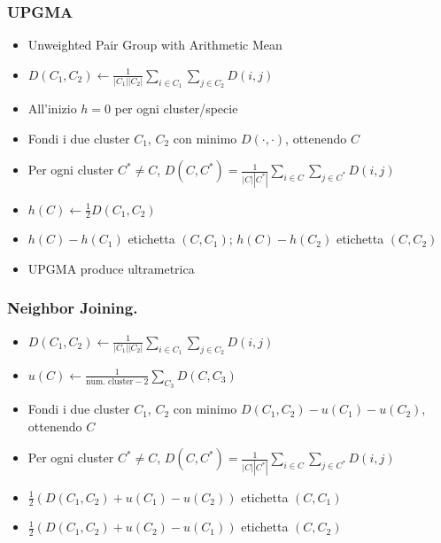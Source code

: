 \begin{frame}[fragile]
        \frametitle{UPGMA}
        \begin{itemize}
                \item
                      Unweighted Pair Group with Arithmetic Mean
                \item
                      $D(C_{1}, C_{2}) \gets \frac{1}{|C_{1}||C_{2}|}\sum_{i\in C_{1}}\sum_{j\in C_{2}} D(i,j)$
                \item
                      All'inizio $h=0$ per ogni cluster/specie
                \item
                      Fondi i due cluster $C_{1}$, $C_{2}$ con minimo $D(\cdot, \cdot)$, ottenendo $C$
                \item
                      Per ogni cluster $C^{*}\neq C$, $D(C, C^{*}) = \frac{1}{|C||C^{*}|}\sum_{i\in C}\sum_{j\in C^{*}} D(i,j)$
                \item
                      $h(C)\gets \frac{1}{2}D(C_{1}, C_{2})$
                \item
                      $h(C) - h(C_{1})$ etichetta $(C, C_{1})$; $h(C) - h(C_{2})$ etichetta $(C, C_{2})$
                \item
                      UPGMA produce ultrametrica
        \end{itemize}
\end{frame}

\begin{frame}[fragile]
        \frametitle{Neighbor Joining.}
        \begin{itemize}
                \item
                      $D(C_{1}, C_{2}) \gets \frac{1}{|C_{1}||C_{2}|}\sum_{i\in C_{1}}\sum_{j\in C_{2}} D(i,j)$
                \item
                      $u(C) \gets \frac{1}{\text{num. cluster} - 2} \sum_{C_{3}} D(C,C_{3})$
                \item
                      Fondi i due cluster $C_{1}$, $C_{2}$ con minimo $D(C_{1}, C_{2}) - u(C_{1}) -u(C_{2})$, ottenendo $C$
                \item
                      Per ogni cluster $C^{*}\neq C$, $D(C, C^{*}) = \frac{1}{|C||C^{*}|}\sum_{i\in C}\sum_{j\in C^{*}} D(i,j)$
                \item
                      $\frac{1}{2}\left(D(C_{1}, C_{2}) + u(C_{1}) - u(C_{2})\right)$ etichetta $(C, C_{1})$
                \item
                      $\frac{1}{2}\left(D(C_{1}, C_{2}) + u(C_{2}) - u(C_{1})\right)$ etichetta $(C, C_{2})$
        \end{itemize}
\end{frame}

